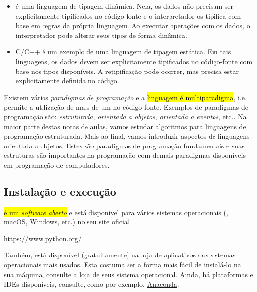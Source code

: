 \begin{itemize}
\item {}

  {\python} é uma linguagem de tipagem dinâmica. Nela, os dados não precisam ser explicitamente tipificados no código-fonte e o interpretador os tipifica com base em regras da própria linguagem. Ao executar operações com os dados, o interpretador pode alterar seus tipos de forma dinâmica.

\item {}

  \href{https://pt.wikipedia.org/wiki/C\%2B\%2B}{C/C++} é um exemplo de uma linguagem de tipagem estática. Em tais linguagens, os dados devem ser explicitamente tipificados no código-fonte com base nos tipos disponíveis. A retipificação pode ocorrer, mas precisa estar explicitamente definida no código.
\end{itemize}

Existem vários \emph{paradigmas de programação} e a \hl{linguagem {\python} é multiparadigma}, i.e. permite a utilização de mais de um no código-fonte. Exemplos de paradigmas de programação são: \emph{estruturada}, \emph{orientada a objetos}, \emph{orientada a eventos}, etc.. Na maior parte destas notas de aulas, vamos estudar algoritmos para linguagens de programação estruturada. Mais ao final, vamos introduzir aspectos de linguagens orientada a objetos. Estes são paradigmas de programação fundamentais e suas estruturas são importantes na programação com demais paradigmas disponíveis em programação de computadores.

\subsection{Instalação e execução}

\hl{{\python} é um \emph{software aberto}} e está disponível para vários sistemas operacionais ({\linux}, macOS, Windows, etc.) no seu site oficial
\begin{center}
  \url{https://www.python.org/}
\end{center}
Também, está disponível (gratuitamente) na loja de aplicativos dos sistemas operacionais mais usados. Esta costuma ser a forma mais fácil de instalá-lo na sua máquina, consulte a loja de seus sistema operacional. Ainda, há plataformas e IDEs {\python} disponíveis, consulte, como por exemplo, \href{https://www.anaconda.com/}{Anaconda}.

